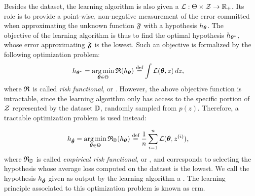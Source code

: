 Besides the dataset, the learning algorithm is also given a  $\Loss: \Theta \times \Cal{Z} \shortrightarrow \Real_+$. Its role is to provide a point-wise, non-negative measurement of the error committed when approximating the unknown function $\mathfrak{F}$ with a hypothesis $h_{\boldsymbol{\theta}}$. The objective of the learning algorithm is thus to find the optimal hypothesis $h_{\boldsymbol{\theta}^{*}}$, whose error approximating $\mathfrak{F}$ is the lowest. Such an objective is formalized by the following optimization problem:
$$h_{\StarParam} = \argmin_{\Param \in \Theta} \Risk(h_{\Param}) \defeq \int \Loss(\Param, z)\, dz,$$
where $\mathfrak{R}$ is called \emph{risk functional}, or . However, the above objective function is intractable, since the learning algorithm only has access to the specific portion of $\Cal{Z}$ represented by the dataset $\mathbb{D}$, randomly sampled from $p(z)$. Therefore, a tractable optimization problem is used instead:

$$h_{\HatParam} = \argmin_{\Param \in \Theta} \Risk_{\Data}(h_{\Param}) \defeq \frac{1}{n} \sum_{i=1}^n \Loss(\Param, \Pattern{z}{i}),$$
where $\mathfrak{R}_{\mathbb{D}}$ is called \emph{empirical risk functional}, or , and corresponds to selecting the hypothesis whose average loss computed on the dataset is the lowest. We call the hypothesis $h_{\boldsymbol{\hat{\theta}}}$ given as output by the learning algorithm a . The learning principle associated to this optimization problem is known as \gls{erm}.

